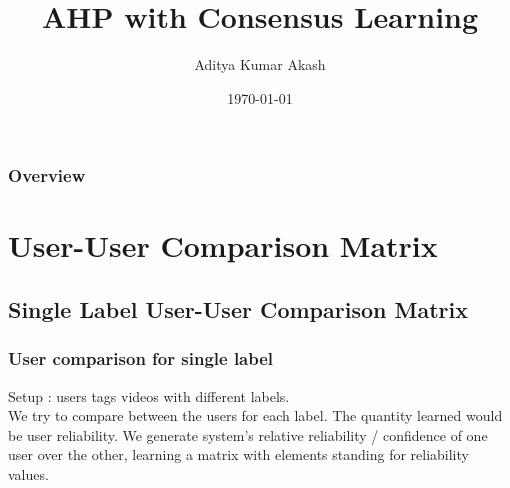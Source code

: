 \documentclass{beamer}
\title[AHP, Consensus]{AHP with Consensus Learning} %
\author{Aditya Kumar Akash} %
\institute[IITB] %
{
IIT Bombay \\ %
\medskip
\textit{adityakumarakash@gmail.com} %
}
\date{\today} %
\begin{document}
\begin{frame}
\titlepage %
\end{frame}

\begin{frame}
\frametitle{Overview} %
\tableofcontents %
\end{frame}


\section{User-User Comparison Matrix} %

\subsection{Single Label User-User Comparison Matrix} %

\begin{frame}
\frametitle{User comparison for single label}
Setup : users tags videos with different labels. \\
We try to compare between the users for each label. The quantity learned would be user reliability. We generate system's relative reliability / confidence of one user over the other, learning a matrix with elements standing for reliability values.

\end{frame}
\end{document}
